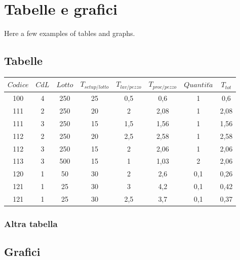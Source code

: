 \documentclass{FR16}
\begin{document}
\newpage

\section{Tabelle e grafici}
Here a few examples of tables and graphs.
\subsection{Tabelle}
\begin{center}
\begin{tabular}{c c c c c c c c}
\arrayrulecolor{Azzurro}
\hline
{\bfseries $Codice$} & {\bfseries $CdL$} & {\bfseries $Lotto$} & {\bfseries $T_{setup/lotto}$} & {\bfseries $T_{lav/pezzo}$} & {\bfseries $T_{proc/pezzo}$} & {\bfseries$Quantit\grave{a}$} & {\bfseries $T_{tot}$}\\
\hline
100 & 4 & 250 & 25 & 0,5 & 0,6 & 1 & 0,6\\
111 & 2 & 250 & 20 & 2 & 2,08 & 1 & 2,08 \\
111 & 3 & 250 & 15 & 1,5 & 1,56 & 1 & 1,56 \\
112 & 2 & 250 & 20 & 2,5 & 2,58 & 1 & 2,58 \\
112 & 3 & 250 & 15 & 2 & 2,06 & 1 & 2,06\\
113 & 3 & 500 & 15 & 1 & 1,03 & 2 & 2,06\\
120 & 1 & 50 & 30 & 2 & 2,6 & 0,1 & 0,26\\
121 & 1 & 25 & 30 & 3 & 4,2 & 0,1 & 0,42 \\
121 & 1 & 25 & 30 & 2,5 & 3,7 & 0,1 & 0,37 \\
\hline
\end{tabular}
\end{center}

\subsubsection{Altra tabella}
\subsection{Grafici}
\begin{center}

\end{center}
\end{document}

